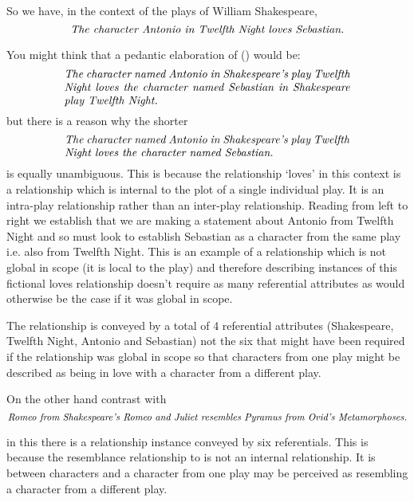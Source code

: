 \mynote 
So we have, in the context of the plays of William Shakespeare,
\begin{equation}
\label{AntonioLovesSebastian2}
\mbox{\textit{The character Antonio in Twelfth Night loves Sebastian.}}
\end{equation} 

You might think that a pedantic elaboration of (\label{AntonioLovesSebastian}) would be:
\begin{equation}
\text{\parbox{9cm}{\textit{The character named Antonio in Shakespeare's play Twelfth Night loves the character named Sebastian in Shakespeare play Twelfth Night.}}}
\end{equation} 
but there is a reason why the shorter
\begin{equation}
\text{\parbox{9cm}{\textit{The character named Antonio in Shakespeare's play Twelfth Night loves the character named Sebastian.}}}
\end{equation} 
is equally unambiguous. This is because the relationship `loves' in this context is a relationship which is internal to the plot of a single individual play. 
It is an intra-play relationship rather than an inter-play relationship.
Reading from left to right we establish that we are making a statement about 
Antonio from Twelfth Night  and so must look to establish Sebastian as a character from the same play i.e. also from Twelfth Night. This is an example of a relationship which is not global in scope (it is local to the play) and therefore describing instances of this fictional loves relationship
doesn't require as many referential attributes as would otherwise be the case if it was global in scope. 

The relationship is conveyed by a total of  4 referential attributes
(Shakespeare, Twelfth Night, Antonio and Sebastian) not the six that might have been required
if the relationship was global in scope so that characters from one play might be described as being in love with a character from a different play.

On the other hand contrast with
\begin{equation}
\mbox{\textit{Romeo from Shakespeare's Romeo and Juliet resembles Pyramus from Ovid's 
Metamorphoses.}}
\end{equation}

in this there is a relationship instance conveyed by six referentials. This is because the resemblance relationship to is not an internal relationship. It is between characters and a character from one play may be perceived as resembling a character from a different play.

